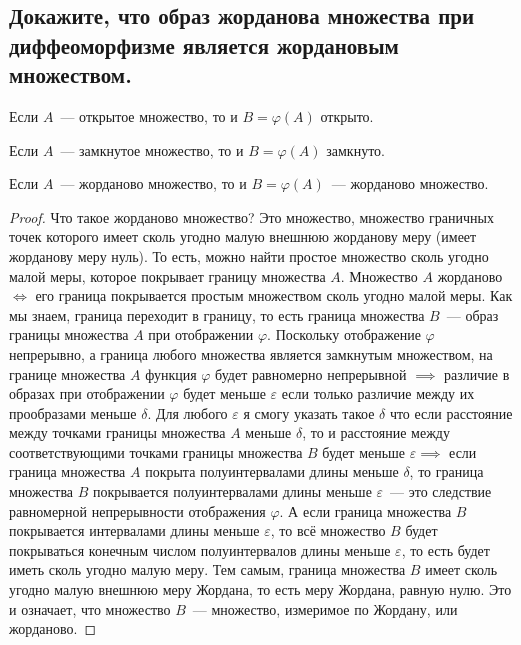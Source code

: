
\subsection{Докажите, что образ жорданова множества при диффеоморфизме является жордановым множеством.}

Если $A$~--- открытое множество, то и $B = \varphi(A)$ открыто.

Если $A$~--- замкнутое множество, то и $B = \varphi(A)$ замкнуто.

\begin{theorem*}
    Если $A$~--- жорданово множество, то и $B = \varphi(A)$~--- жорданово множество.
\end{theorem*}
\begin{proof}
    Что такое жорданово множество? Это множество, множество граничных точек которого имеет сколь угодно малую внешнюю жорданову меру (имеет жорданову меру нуль). То есть, можно найти простое множество сколь угодно малой меры, которое покрывает границу множества $A$. Множество $A$ жорданово $\iff$ его граница покрывается простым множеством сколь угодно малой меры. Как мы знаем, граница переходит в границу, то есть граница множества $B$~--- образ границы множества $A$ при отображении $\varphi$. Поскольку отображение $\varphi$ непрерывно, а граница любого множества является замкнутым множеством, на границе множества $A$ функция $\varphi$ будет равномерно непрерывной $\implies$ различие в образах при отображении $\varphi$ будет меньше $\varepsilon$ если только различие между их прообразами меньше $\delta$. Для любого $\varepsilon$ я смогу указать такое $\delta$ что если расстояние между точками границы множества $A$ меньше $\delta$, то и расстояние между соответствующими точками границы множества $B$ будет меньше $\varepsilon \implies$ если граница множества $A$ покрыта полуинтервалами длины меньше $\delta$, то граница множества $B$ покрывается полуинтервалами длины меньше $\varepsilon$~--- это следствие равномерной непрерывности отображения $\varphi$. А если граница множества $B$ покрывается интервалами длины меньше $\varepsilon$, то всё множество $B$ будет покрываться конечным числом полуинтервалов длины меньше $\varepsilon$, то есть будет иметь сколь угодно малую меру. Тем самым, граница множества $B$ имеет сколь угодно малую внешнюю меру Жордана, то есть меру Жордана, равную нулю. Это и означает, что множество $B$~--- множество, измеримое по Жордану, или жорданово.
    
\end{proof}